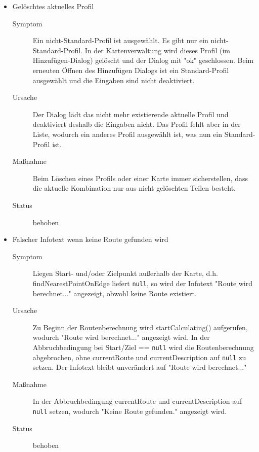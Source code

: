 \documentclass[a4paper, 11pt]{article}
\makeatletter
\def\namedlabel#1#2{\begingroup
    #2%
    \def\@currentlabel{#2}%
    \phantomsection\label{#1}\endgroup
}
\newcommand{\oitem}[2]{
  \@ifundefined{c@oitem#1}{\newcounter{oitem#1}}{} %
  \addtocounter{oitem#1}{10}
  \item[\namedlabel{#1:#2}{/#1\arabic{oitem#1}/}]
}
\newcommand{\bug}[6]{%
  \oitem{BG}{#1}
  	#2
    \begin{description}
    \item[Symptom] #3
    \item[Ursache] #4
    \item[Maßnahme] #5
    \item[Status] #6
    \end{description}
}
\newcommand{\code}[1]{\texttt{#1}}
\makeatother
\begin{document}
\begin{itemize}
{    oder soll vorberechnet werden.
    Jetzt wird dieses Profil im Dialog für das Hinzufügen neuer Profile gelöscht.
    Das Profil ist weiterhin in der Liste der Karte vorhanden.}
    {Beim Beenden des Dialogs werden gelöschte Profile nicht richtig erkannt und verarbeitet.}
    {Weiteren Code hinzufügen, der alle gelöschten Profile ermittelt und sie direkt aus den Listen löscht.}
    {behoben}
\bug{currentProfileNotExisting}{Gelöschtes aktuelles Profil}
    {Ein nicht-Standard-Profil ist ausgewählt. Es gibt nur ein nicht-Standard-Profil.
    In der Kartenverwaltung wird dieses Profil (im Hinzufügen-Dialog) gelöscht
    und der Dialog mit "ok" geschlossen.
    Beim erneuten Öffnen des Hinzufügen Dialogs ist ein Standard-Profil ausgewählt
    und die Eingaben sind nicht deaktiviert.}
    {Der Dialog lädt das nicht mehr existierende aktuelle Profil
    und deaktiviert deshalb die Eingaben nicht.
    Das Profil fehlt aber in der Liste, wodurch ein anderes Profil ausgewählt ist,
    was nun ein Standard-Profil ist.}
    {Beim Löschen eines Profils oder einer Karte immer sicherstellen,
    dass die aktuelle Kombination nur aus nicht gelöschten Teilen besteht.}
    {behoben}
\bug{noRouteWirdBerechnet}{Falscher Infotext wenn keine Route gefunden wird}
	{Liegen Start- und/oder Zielpunkt außerhalb der Karte,
	d.h. findNearestPointOnEdge liefert \code{null},
	so wird der Infotext "Route wird berechnet..." angezeigt, obwohl keine Route existiert.}
	{Zu Beginn der Routenberechnung wird startCalculating() aufgerufen, wodurch "Route wird berechnet..." angezeigt wird.
	In der Abbruchbedingung bei Start/Ziel == \code{null} wird die Routenberechnung abgebrochen,
	ohne currentRoute und currentDescription auf \code{null} zu setzen.
	Der Infotext bleibt unverändert auf "Route wird berechnet..."}
	{In der Abbruchbedingung currentRoute und currentDescription auf \code{null} setzen, wodurch "Keine Route gefunden." angezeigt wird.}
	{behoben}
\end{itemize}
\end{document}
